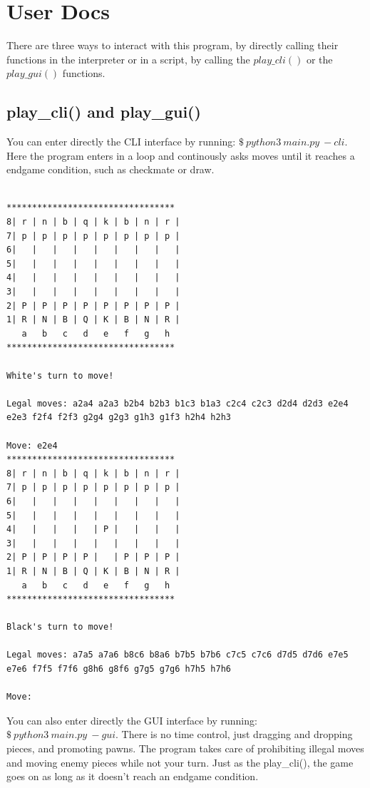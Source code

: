 \documentclass[10pt]{article}
\begin{document}
\pagebreak
\section{User Docs}

There are three ways to interact with this program, by directly calling their
functions in the interpreter or in a script, by calling the $play\_cli()$ or the
$play\_gui()$ functions. 

\subsection{play\_cli() and play\_gui()}

You can enter directly the CLI interface by running: $\$~python3~main.py~-cli$.
Here the program enters in a loop and continously asks moves until it reaches a
endgame condition, such as checkmate or draw.

\begin{lstlisting}

*********************************
8| r | n | b | q | k | b | n | r |
7| p | p | p | p | p | p | p | p |
6|   |   |   |   |   |   |   |   |
5|   |   |   |   |   |   |   |   |
4|   |   |   |   |   |   |   |   |
3|   |   |   |   |   |   |   |   |
2| P | P | P | P | P | P | P | P |
1| R | N | B | Q | K | B | N | R |
   a   b   c   d   e   f   g   h
*********************************

White's turn to move!

Legal moves: a2a4 a2a3 b2b4 b2b3 b1c3 b1a3 c2c4 c2c3 d2d4 d2d3 e2e4 e2e3 f2f4 f2f3 g2g4 g2g3 g1h3 g1f3 h2h4 h2h3

Move: e2e4
*********************************
8| r | n | b | q | k | b | n | r |
7| p | p | p | p | p | p | p | p |
6|   |   |   |   |   |   |   |   |
5|   |   |   |   |   |   |   |   |
4|   |   |   |   | P |   |   |   |
3|   |   |   |   |   |   |   |   |
2| P | P | P | P |   | P | P | P |
1| R | N | B | Q | K | B | N | R |
   a   b   c   d   e   f   g   h
*********************************

Black's turn to move!

Legal moves: a7a5 a7a6 b8c6 b8a6 b7b5 b7b6 c7c5 c7c6 d7d5 d7d6 e7e5 e7e6 f7f5 f7f6 g8h6 g8f6 g7g5 g7g6 h7h5 h7h6

Move:

\end{lstlisting}

You can also enter directly the GUI interface by running:
$\$~python3~main.py~-gui$. There is no time control, just dragging and dropping
pieces, and promoting pawns. The program takes care of prohibiting illegal moves
and moving enemy pieces while not your turn. Just as the play\_cli(), the game
goes on as long as it doesn't reach an endgame condition.
\end{document}
